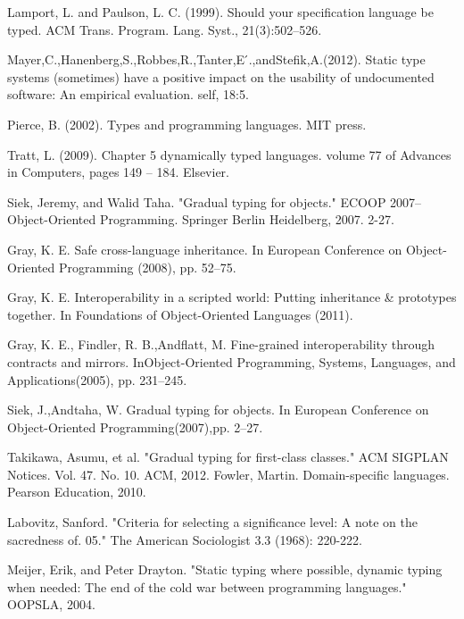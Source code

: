 \documentclass[preprint]{sigplanconf}
\begin{document}
\begin{thebibliography}{}
Lamport, L. and Paulson, L. C. (1999). Should your specification language be typed. ACM Trans. Program. Lang. Syst., 21(3):502–526.

Mayer,C.,Hanenberg,S.,Robbes,R.,Tanter,E ́.,andStefik,A.(2012). Static type systems (sometimes) have a positive impact on the usability of undocumented software: An empirical evaluation. self, 18:5.

Pierce, B. (2002). Types and programming languages. MIT press.

Tratt, L. (2009). Chapter 5 dynamically typed languages. volume 77 of Advances in Computers, pages 149 – 184. Elsevier.

Siek, Jeremy, and Walid Taha. "Gradual typing for objects." ECOOP 2007–Object-Oriented Programming. Springer Berlin Heidelberg, 2007. 2-27.

Gray, K. E. Safe cross-language inheritance. In European Conference on Object-Oriented Programming (2008), pp. 52–75.

Gray, K. E. Interoperability in a scripted world: Putting inheritance \& prototypes together. In Foundations of Object-Oriented Languages (2011).

Gray, K. E., Findler, R. B.,Andflatt, M. Fine-grained interoperability through contracts and mirrors. InObject-Oriented Programming, Systems, Languages, and Applications(2005), pp. 231–245.

Siek, J.,Andtaha, W. Gradual typing for objects. In European Conference on Object-Oriented Programming(2007),pp. 2–27.

Takikawa, Asumu, et al. "Gradual typing for first-class classes." ACM SIGPLAN Notices. Vol. 47. No. 10. ACM, 2012.
Fowler, Martin. Domain-specific languages. Pearson Education, 2010.

Labovitz, Sanford. "Criteria for selecting a significance level: A note on the sacredness of. 05." The American Sociologist 3.3 (1968): 220-222.

Meijer, Erik, and Peter Drayton. "Static typing where possible, dynamic typing when needed: The end of the cold war between programming languages." OOPSLA, 2004.


\end{thebibliography}
\end{document}
